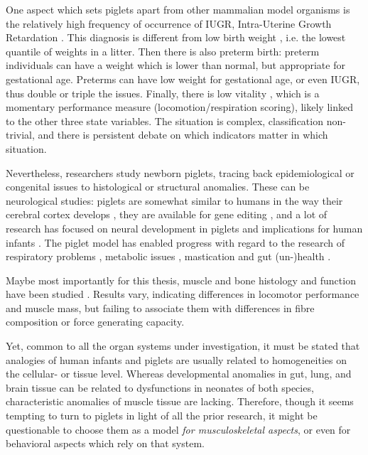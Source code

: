 One aspect which sets piglets apart from other mammalian model organisms is the relatively high frequency of occurrence of IUGR, Intra-Uterine Growth Retardation \citep{Widdowson1971,Wu2006,VanGinneken2022}.
This diagnosis is different from low birth weight \citep{Wootton1983}, i.e. the lowest quantile of weights in a litter.
Then there is also preterm birth: preterm individuals can have a weight which is lower than normal, but appropriate for gestational age.
Preterms can have low weight for gestational age, or even IUGR, thus double or triple the issues.
Finally, there is low vitality \citep{VandenHole2018}, which is a momentary performance measure (locomotion/respiration scoring), likely linked to the other three state variables.
The situation is complex, classification non-trivial, and there is persistent debate on which indicators matter in which situation.


Nevertheless, researchers study newborn piglets, tracing back epidemiological or congenital issues to histological or structural anomalies.
These can be neurological studies: piglets are somewhat similar to humans in the way their cerebral cortex develops \citep[e.g.][]{Lind2007}, they are available for gene editing \citep{Lind2007}, and a lot of research has focused on neural development in piglets and implications for human infants \citep{Conrad2012,Radlowski2014,Leyshon2016,Mudd2017,Dickerson1971,Fanous2020}.
The piglet model has enabled progress with regard to the research of respiratory problems \citep{Williams1974,Spengler2019}, metabolic issues \citep{Mellor1986,MotaRojas2011,VandenHole2019}, mastication and gut (un-)health \citep{Che2010,Cilieborg2011,Sangild2006,DInca2011,VandenHole2021,Mayerl2023b}.

Maybe most importantly for this thesis, muscle and bone histology and function have been studied \citep{VandenHole2018b,Alvarenga2013,Andersen2016,Aerts2023,Magrini2023}.
Results vary, indicating differences in locomotor performance and muscle mass, but failing to associate them with differences in fibre composition or force generating capacity.

Yet, common to all the organ systems under investigation, it must be stated that analogies of human infants and piglets are usually related to homogeneities on the cellular- or tissue level.
Whereas developmental anomalies in gut, lung, and brain tissue can be related to dysfunctions in neonates of both species, characteristic anomalies of muscle tissue are lacking.
Therefore, though it seems tempting to turn to piglets in light of all the prior research, it might be questionable to choose them as a model \emph{for musculoskeletal aspects}, or even for behavioral aspects which rely on that system.


